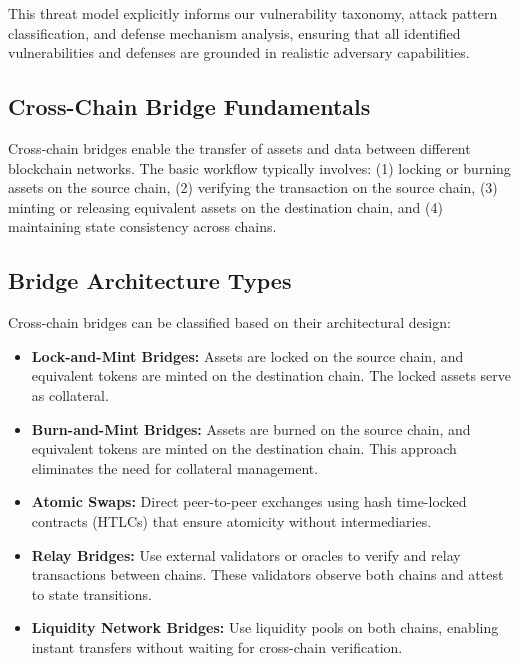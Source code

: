 \documentclass[runningheads]{llncs}
\begin{document}
This threat model explicitly informs our vulnerability taxonomy, attack pattern classification, and defense mechanism analysis, ensuring that all identified vulnerabilities and defenses are grounded in realistic adversary capabilities.

\subsection{Cross-Chain Bridge Fundamentals}
Cross-chain bridges enable the transfer of assets and data between different blockchain networks. The basic workflow typically involves: (1) locking or burning assets on the source chain, (2) verifying the transaction on the source chain, (3) minting or releasing equivalent assets on the destination chain, and (4) maintaining state consistency across chains.

\subsection{Bridge Architecture Types}
Cross-chain bridges can be classified based on their architectural design:

\begin{itemize}
    \item \textbf{Lock-and-Mint Bridges:} Assets are locked on the source chain, and equivalent tokens are minted on the destination chain. The locked assets serve as collateral.
    
    \item \textbf{Burn-and-Mint Bridges:} Assets are burned on the source chain, and equivalent tokens are minted on the destination chain. This approach eliminates the need for collateral management.
    
    \item \textbf{Atomic Swaps:} Direct peer-to-peer exchanges using hash time-locked contracts (HTLCs) that ensure atomicity without intermediaries.
    
    \item \textbf{Relay Bridges:} Use external validators or oracles to verify and relay transactions between chains. These validators observe both chains and attest to state transitions.
    
    \item \textbf{Liquidity Network Bridges:} Use liquidity pools on both chains, enabling instant transfers without waiting for cross-chain verification.
\end{itemize}
\end{document}
